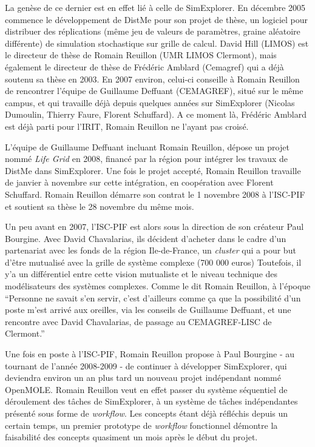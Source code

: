 La genèse de ce dernier est en effet lié à celle de SimExplorer. En décembre 2005 \textcite{Reuillon2008a} commence le développement de DistMe pour son projet de thèse, un logiciel pour distribuer des réplications (même jeu de valeurs de paramètres, graine aléatoire différente) de simulation stochastique sur grille de calcul. David Hill (LIMOS) est le directeur de thèse de Romain Reuillon (UMR LIMOS Clermont), mais également le directeur de thèse de Frédéric Amblard (Cemagref) qui a déjà soutenu sa thèse en 2003. En 2007 environ, celui-ci conseille à Romain Reuillon de rencontrer l'équipe de Guillaume Deffuant (CEMAGREF), situé sur le même campus, et qui travaille déjà depuis quelques années sur SimExplorer (Nicolas Dumoulin, Thierry Faure, Florent Schuffard). A ce moment là, Frédéric Amblard est déjà parti pour l'IRIT, Romain Reuillon ne l'ayant pas croisé.

L'équipe de Guillaume Deffuant incluant Romain Reuillon, dépose un projet nommé \textit{Life Grid} en 2008, financé par la région pour intégrer les travaux de DistMe dans SimExplorer. Une fois le projet accepté, Romain Reuillon travaille de janvier à novembre sur cette intégration, en coopération avec Florent Schuffard. Romain Reuillon démarre son contrat le 1 novembre 2008 à l'ISC-PIF et soutient sa thèse le 28 novembre du même mois.

Un peu avant en 2007, l'ISC-PIF est alors sous la direction de son créateur Paul Bourgine. Avec David Chavalarias, ils décident d'acheter dans le cadre d'un partenariat avec les fonds de la région Ile-de-France, un \textit{cluster} qui a pour but d'être mutualisé avec la grille de système complexe (700 000 euros) Toutefois, il y'a un différentiel entre cette vision mutualiste et le niveau technique des modélisateurs des systèmes complexes. Comme le dit Romain Reuillon, à l'époque \enquote{Personne ne savait s'en servir, c'est d'ailleurs comme ça que la possibilité d'un poste m'est arrivé aux oreilles, via les conseils de Guillaume Deffuant, et une rencontre avec David Chavalarias, de passage au CEMAGREF-LISC de Clermont.}

Une fois en poste à l'ISC-PIF, Romain Reuillon propose à Paul Bourgine - au tournant de l'année 2008-2009 - de continuer à développer SimExplorer, qui deviendra environ un an plus tard un nouveau projet indépendant nommé OpenMOLE. Romain Reuillon veut en effet passer du système séquentiel de déroulement des tâches de SimExplorer, à un système de tâches indépendantes présenté sous forme de \textit{workflow}. Les concepts étant déjà réfléchis depuis un certain temps, un premier prototype de \textit{workflow} fonctionnel démontre la faisabilité des concepts quasiment un mois après le début du projet.

